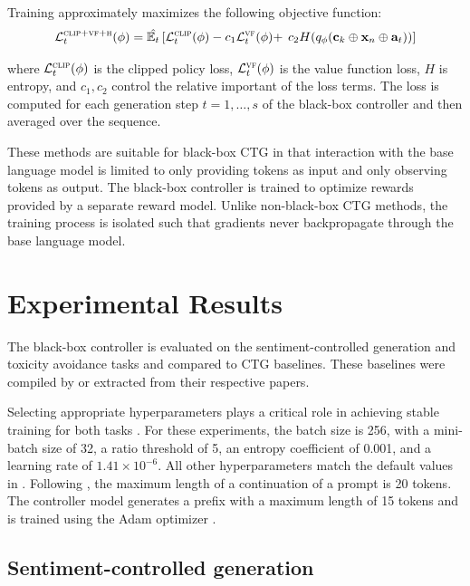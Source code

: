 \documentclass[phd,electronic,oneside,twosidetoc,letterpaper,chaptercenter,parttop,lof]{byumsphd}
\begin{document}
Training approximately maximizes the following objective function:
\begin{align*}
    \mathcal{L}_t^{\textsc{clip}+\textsc{vf}+\textsc{h}} (\phi) = \hat{\mathbb{E}_t} \left[ \mathcal{L}_t^{\textsc{clip}} (\phi) - c_1 \mathcal{L}_t^{\textsc{vf}}(\phi) + \right.
    \left. c_2 H(q_\phi(\mathbf{c}_{k} \oplus \mathbf{x}_n \oplus \mathbf{a}_t)) \right]
\end{align*}

where \(\mathcal{L}_t^{\textsc{clip}}(\phi)\) is the clipped policy loss, \(\mathcal{L}_t^{\textsc{vf}}(\phi)\) is the value function loss, \(H\) is entropy, and \(c_1, c_2\) control the relative important of the loss terms.  The loss is computed for each generation step \(t = 1, \ldots, s\) of the black-box controller and then averaged over the sequence.

These methods are suitable for black-box CTG in that interaction with the base language model is limited to only providing tokens as input and only observing tokens as output. The black-box controller is trained to optimize rewards provided by a separate reward model. Unlike non-black-box CTG methods, the training process is isolated such that gradients never backpropagate through the base language model.

\section{Experimental Results}
\label{experiments}

The black-box controller is evaluated on the sentiment-controlled generation and toxicity avoidance tasks and compared to CTG baselines.
These baselines were compiled by \citet{liu2021dexpert} or extracted from their respective papers.

Selecting appropriate hyperparameters plays a critical role in achieving stable training for both tasks
\citet{ziegler2019preferences}. For these experiments, the batch size is 256, with a mini-batch size of 32, a ratio threshold of 5, an entropy coefficient of 0.001, and a learning rate of \(1.41 \times 10^{-6}\). All other hyperparameters match the default values in \citet{vonwerra2022trl}.
Following \citet{liu2021dexpert}, the maximum length of a continuation of a prompt is 20 tokens.
The controller model generates a prefix with a maximum length of 15 tokens and is trained using the Adam optimizer \citep{kingma2017adam}.

\subsection{Sentiment-controlled generation}
\end{document}
